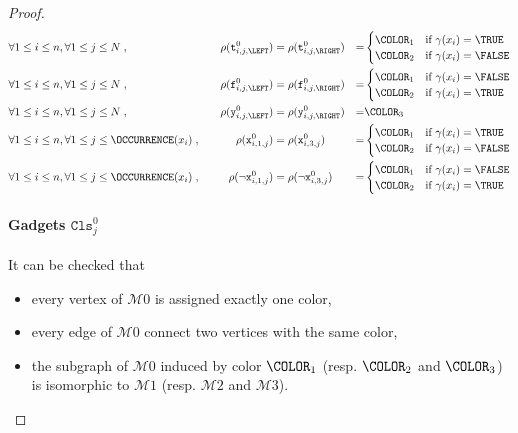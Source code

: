 \begin{proof}
  \begin{alignat*}{4}
    &\forall 1 \leq i \leq n, \forall 1 \leq j \leq N\;,
    &\quad
    \rho(\texttt{t}^{0}_{i, j, \LEFT}) &= \rho(\texttt{t}^{0}_{i, j, \RIGHT}) &=&
    \begin{cases}
      \COLOR_1 & \text{if $\gamma(x_i) = \TRUE$}\\
      \COLOR_2 & \text{if $\gamma(x_i) = \FALSE$}
    \end{cases}
    \\
    &\forall 1 \leq i \leq n, \forall 1 \leq j \leq N\;,
    &\quad
    \rho(\texttt{f}^{0}_{i, j, \LEFT}) &= \rho(\texttt{f}^{0}_{i, j, \RIGHT}) &=&
    \begin{cases}
      \COLOR_1 & \text{if $\gamma(x_i) = \FALSE$}\\
      \COLOR_2 & \text{if $\gamma(x_i) = \TRUE$}
    \end{cases}
    \\
    &\forall 1 \leq i \leq n, \forall 1 \leq j \leq N\;,
    &\quad
    \rho(\texttt{y}^{0}_{i, j, \LEFT}) &= \rho(\texttt{y}^{0}_{i, j, \RIGHT}) &=&
    \COLOR_3
    \\
    &\forall 1 \leq i \leq n, \forall 1 \leq j \leq \OCCURRENCE(x_i)\;,
    &\quad
    \rho(\texttt{x}^{0}_{i, 1, j}) &= \rho(\texttt{x}^{0}_{i, 3, j}) &=&
    \begin{cases}
      \COLOR_1 & \text{if $\gamma(x_i) = \TRUE$}\\
      \COLOR_2 & \text{if $\gamma(x_i) = \FALSE$}
    \end{cases}
    \\
    &\forall 1 \leq i \leq n, \forall 1 \leq j \leq \OCCURRENCE(x_i)\;,
    &\quad
    \rho(\neg\texttt{x}^{0}_{i, 1, j}) &= \rho(\neg\texttt{x}^{0}_{i, 3, j}) &=&
    \begin{cases}
      \COLOR_1 & \text{if $\gamma(x_i) = \FALSE$}\\
      \COLOR_2 & \text{if $\gamma(x_i) = \TRUE$}
    \end{cases}
    \\
  \end{alignat*}

  \paragraph*{Gadgets $\texttt{Cls}^{0}_{j}$}

  It can be checked that
  \begin{itemize}
    \item
    every vertex of $\mathcal{M}{0}$ is assigned exactly one color,
    \item
    every edge of $\mathcal{M}{0}$ connect two vertices with the same color,
    \item
    the subgraph of $\mathcal{M}{0}$ induced by color $\COLOR_1$
    (resp. $\COLOR_2$ and $\COLOR_3$) is isomorphic to $\mathcal{M}{1}$
    (resp. $\mathcal{M}{2}$ and $\mathcal{M}{3}$).
  \end{itemize}


\end{proof}
